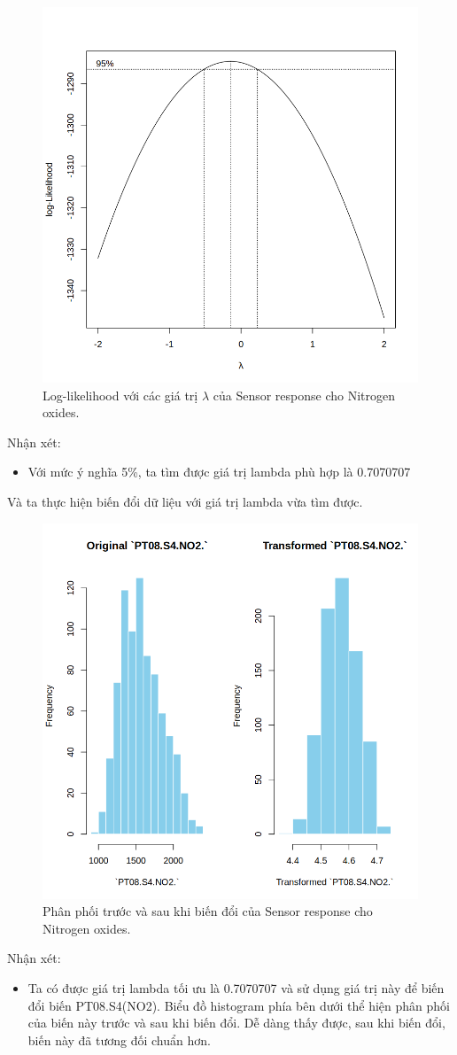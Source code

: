 \begin{figure}[H]
    \centering
    \includegraphics[width=0.75\columnwidth]{air_figures/PT08.S4(NO2)_optimal_lambda.png}
    \caption{Log-likelihood với các giá trị $\lambda$ của Sensor response cho Nitrogen oxides.}
    \label{fig:ptno2_optimal_lambda}
\end{figure}
Nhận xét:
\begin{itemize}
    \item Với mức ý nghĩa 5\%, ta tìm được giá trị lambda phù hợp là 0.7070707
\end{itemize}

Và ta thực hiện biến đổi dữ liệu với giá trị lambda vừa tìm được.
\begin{figure}[H]
    \centering
    \includegraphics[width=0.75\columnwidth]{air_figures/PT08.S4(NO2)_transformed_distribution.png}
    \caption{Phân phối trước và sau khi biến đổi của Sensor response cho Nitrogen oxides.}
    \label{fig:ptno2_transformed_distribution}
\end{figure}
Nhận xét:
\begin{itemize}
    \item Ta có được giá trị lambda tối ưu là 0.7070707 và sử dụng giá trị này để biến đổi biến PT08.S4(NO2). Biểu đồ histogram phía bên dưới thể hiện phân phối của biến này trước và sau khi biến đổi. Dễ dàng thấy được, sau khi biến đổi, biến này đã tương đối chuẩn hơn.
\end{itemize}

